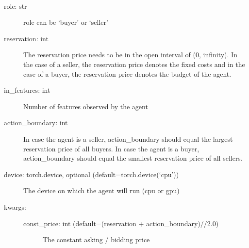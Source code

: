 \documentclass[letterpaper,10pt,english]{sphinxmanual}
\begin{document}
\begin{fulllineitems}
\begin{fulllineitems}
\end{fulllineitems}


\begin{fulllineitems}
\label{\detokenize{MultiAgentMarketRL:agents.ConstAgent.__init__}}~\begin{description}
\item[{role: str}] \leavevmode
\sphinxAtStartPar
role can be ‘buyer’ or ‘seller’

\item[{reservation: int}] \leavevmode
\sphinxAtStartPar
The reservation price needs to be in the open interval of (0, infinity). In the case of a seller, the
reservation price denotes the fixed costs and in the case of a buyer, the reservation price denotes the
budget of the agent.

\item[{in\_features: int}] \leavevmode
\sphinxAtStartPar
Number of features observed by the agent

\item[{action\_boundary: int}] \leavevmode
\sphinxAtStartPar
In case the agent is a seller, action\_boundary should equal the largest reservation price of all buyers.
In case the agent is a buyer, action\_boundary should equal the smallest reservation price of all sellers.

\item[{device: torch.device, optional (default=torch.device(‘cpu’))}] \leavevmode
\sphinxAtStartPar
The device on which the agent will run (cpu or gpu)

\item[{kwargs:}] \leavevmode\begin{description}
\item[{const\_price: int (default=(reservation + action\_boundary)//2.0)}] \leavevmode
\sphinxAtStartPar
The constant asking / bidding price

\end{description}

\end{description}


\end{fulllineitems}
\end{fulllineitems}
\end{document}
